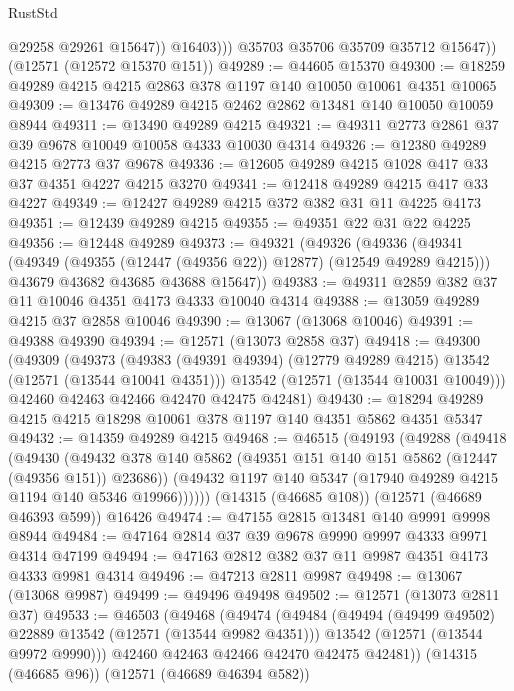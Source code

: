 \begin{lexlean}{RustStd}
\begin{coremodule}
                  @29258
                  @29261
                  @15647))
              @16403)))
        @35703
        @35706
        @35709
        @35712
        @15647))
    (@12571 (@12572 @15370 @151))
@49289 := @44605 @15370
@49300 := @18259 @49289 @4215 @4215 @2863 @378 @1197 @140 @10050 @10061 @4351 @10065
@49309 := @13476 @49289 @4215 @2462 @2862 @13481 @140 @10050 @10059 @8944
@49311 := @13490 @49289 @4215
@49321 := @49311 @2773 @2861 @37 @39 @9678 @10049 @10058 @4333 @10030 @4314
@49326 := @12380 @49289 @4215 @2773 @37 @9678
@49336 := @12605 @49289 @4215 @1028 @417 @33 @37 @4351 @4227 @4215 @3270
@49341 := @12418 @49289 @4215 @417 @33 @4227
@49349 := @12427 @49289 @4215 @372 @382 @31 @11 @4225 @4173
@49351 := @12439 @49289 @4215
@49355 := @49351 @22 @31 @22 @4225
@49356 := @12448 @49289
@49373 := @49321
    (@49326
      (@49336
        (@49341 (@49349 (@49355 (@12447 (@49356 @22)) @12877) (@12549 @49289 @4215)))
        @43679
        @43682
        @43685
        @43688
        @15647))
@49383 := @49311 @2859 @382 @37 @11 @10046 @4351 @4173 @4333 @10040 @4314
@49388 := @13059 @49289 @4215 @37 @2858 @10046
@49390 := @13067 (@13068 @10046)
@49391 := @49388 @49390
@49394 := @12571 (@13073 @2858 @37)
@49418 := @49300
    (@49309
      (@49373
        (@49383 (@49391 @49394) (@12779 @49289 @4215) @13542 (@12571 (@13544 @10041 @4351)))
        @13542
        (@12571 (@13544 @10031 @10049)))
      @42460
      @42463
      @42466
      @42470
      @42475
      @42481)
@49430 := @18294 @49289 @4215 @4215 @18298 @10061 @378 @1197 @140 @4351 @5862 @4351 @5347
@49432 := @14359 @49289 @4215
@49468 := @46515
    (@49193
      (@49288
        (@49418
          (@49430
            (@49432 @378 @140 @5862 (@49351 @151 @140 @151 @5862 (@12447 (@49356 @151)) @23686))
            (@49432 @1197 @140 @5347 (@17940 @49289 @4215 @1194 @140 @5346 @19966))))))
    (@14315 (@46685 @108))
    (@12571 (@46689 @46393 @599))
    @16426
@49474 := @47155 @2815 @13481 @140 @9991 @9998 @8944
@49484 := @47164 @2814 @37 @39 @9678 @9990 @9997 @4333 @9971 @4314 @47199
@49494 := @47163 @2812 @382 @37 @11 @9987 @4351 @4173 @4333 @9981 @4314
@49496 := @47213 @2811 @9987
@49498 := @13067 (@13068 @9987)
@49499 := @49496 @49498
@49502 := @12571 (@13073 @2811 @37)
@49533 := @46503
    (@49468
      (@49474
        (@49484
          (@49494 (@49499 @49502) @22889 @13542 (@12571 (@13544 @9982 @4351)))
          @13542
          (@12571 (@13544 @9972 @9990)))
        @42460
        @42463
        @42466
        @42470
        @42475
        @42481))
    (@14315 (@46685 @96))
    (@12571 (@46689 @46394 @582))

\end{coremodule}
\end{lexlean}
